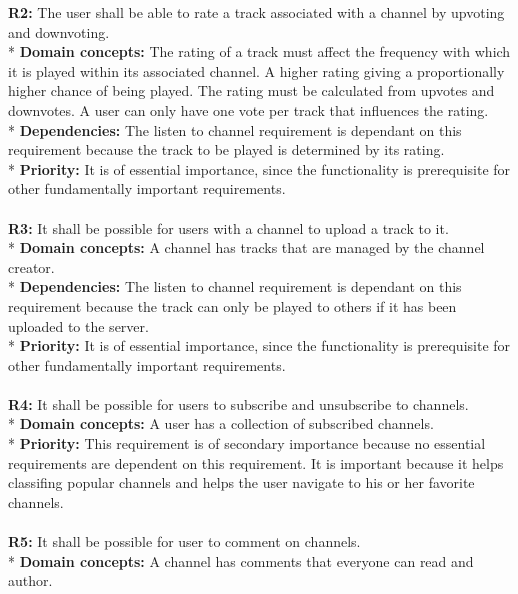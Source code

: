 \documentclass[a4paper,11pt,report]{article}
\begin{document}
\textbf{R2:}
The user shall be able to rate a track associated with a channel by upvoting and downvoting. \\*
\textbf{Domain concepts:}
The rating of a track must affect the frequency with which it is played within its associated channel.
A higher rating giving a proportionally higher chance of being played. The rating must be calculated from upvotes and downvotes. A user can only have one vote per track that influences the rating. \\*
\textbf{Dependencies:}
The listen to channel requirement is dependant on this requirement because the track to be played is determined by its rating.\\*
\textbf{Priority:}
It is of essential importance, since the functionality is prerequisite for other fundamentally important requirements.
\\ \\

\textbf{R3:}
It shall be possible for users with a channel to upload a track to it. \\*
\textbf{Domain concepts:}
A channel has tracks that are managed by the channel creator. \\*
\textbf{Dependencies:}
The listen to channel requirement is dependant on this requirement because the track can only be played to others if it has been uploaded to the server.\\*
\textbf{Priority:}
It is of essential importance, since the functionality is prerequisite for other fundamentally important requirements.
\\ \\

\textbf{R4:}
It shall be possible for users to subscribe and unsubscribe to channels. \\*
\textbf{Domain concepts:}
A user has a collection of subscribed channels. \\*
\textbf{Priority:}
This requirement is of secondary importance because no essential requirements are dependent on this requirement. It is important because it helps classifing popular channels and helps the user navigate to his or her favorite channels.
\\ \\

\textbf{R5:}
It shall be possible for user to comment on channels. \\*
\textbf{Domain concepts:}
A channel has comments that everyone can read and author.
\\ \\
\end{document}
